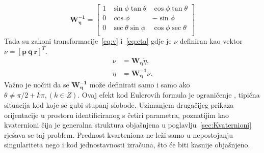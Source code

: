 \documentclass[times, utf8, diplomski]{fer}
\begin{document}
\begin{equation}
	\mathbf{W^{-1}_\eta} =
	\begin{bmatrix}
	1 & \sin\phi\tan\theta & \cos\phi\tan\theta \\
	0 & \cos\phi & -\sin\phi \\
	0 & \sec\theta\sin\phi & \cos\phi\sec\theta \\
	\end{bmatrix}
	\label{eq:matBrzina}
\end{equation}
Tada su zakoni transformacije~\ref{eq:v} i~\ref{eq:eta} gdje je $\nu$ definiran kao vektor $\nu=[\mathbf{p ~q ~r}]^T$.
\begin{align}
\nu&=\mathbf{W_\eta}\dot{\eta},\label{eq:v}\\
\dot{\eta}&=\mathbf{W^{-1}_\eta}\nu.\label{eq:eta}
\end{align}
Važno je uočiti da se $\mathbf{W^{-1}_\eta}$ može definirati samo i samo ako $\theta \neq \pi/2+k\pi, (k \in Z)$. Ovaj efekt kod Eulerovih formula je ograničenje , tipična situacija kod koje se gubi stupanj slobode. Uzimanjem drugačijeg prikaza orijentacije u prostoru identificiranog s četiri parametra, poznatijim kao kvaternioni čija je generalna struktura objašnjena u poglavlju~\ref{sec:Kvaternioni} rješava se taj problem. Prednost kvarteniona ne leži samo u nepostojanju singulariteta nego i kod jednostavnosti izračuna, što će biti kasnije objašnjeno.
\end{document}
